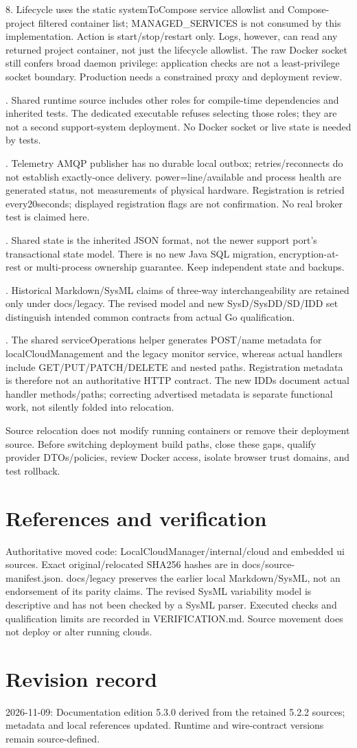 \documentclass[a4paper]{arrowhead}
\begin{document}
8. Lifecycle uses the static systemToCompose service allowlist and Compose-project filtered container list; MANAGED\_SERVICES is not consumed by this implementation. Action is start/stop/restart only. Logs, however, can read any returned project container, not just the lifecycle allowlist. The raw Docker socket still confers broad daemon privilege: application checks are not a least-privilege socket boundary. Production needs a constrained proxy and deployment review.\par{}. Shared runtime source includes other roles for compile-time dependencies and inherited tests. The dedicated executable refuses selecting those roles; they are not a second support-system deployment. No Docker socket or live state is needed by tests.\par{}. Telemetry AMQP publisher has no durable local outbox; retries/reconnects do not establish exactly-once delivery. power=line/available and process health are generated status, not measurements of physical hardware. Registration is retried every20seconds; displayed registration flags are not confirmation. No real broker test is claimed here.\par{}. Shared state is the inherited JSON format, not the newer support port's transactional state model. There is no new Java SQL migration, encryption-at-rest or multi-process ownership guarantee. Keep independent state and backups.\par{}. Historical Markdown/SysML claims of three-way interchangeability are retained only under docs/legacy. The revised model and new SysD/SysDD/SD/IDD set distinguish intended common contracts from actual Go qualification.\par{}. The shared serviceOperations helper generates POST/name metadata for localCloudManagement and the legacy monitor service, whereas actual handlers include GET/PUT/PATCH/DELETE and nested paths. Registration metadata is therefore not an authoritative HTTP contract. The new IDDs document actual handler methods/paths; correcting advertised metadata is separate functional work, not silently folded into relocation.\par\medskip
Source relocation does not modify running containers or remove their deployment source. Before switching deployment build paths, close these gaps, qualify provider DTOs/policies, review Docker access, isolate browser trust domains, and test rollback.\par\medskip
\section{References and verification}
Authoritative moved code: LocalCloudManager/internal/cloud and embedded ui sources. Exact original/relocated SHA256 hashes are in docs/source-manifest.json. docs/legacy preserves the earlier local Markdown/SysML, not an endorsement of its parity claims. The revised SysML variability model is descriptive and has not been checked by a SysML parser. Executed checks and qualification limits are recorded in VERIFICATION.md. Source movement does not deploy or alter running clouds.
\section{Revision record}
2026-11-09: Documentation edition 5.3.0 derived from the retained 5.2.2 sources; metadata and local references updated. Runtime and wire-contract versions remain source-defined.
\end{document}
